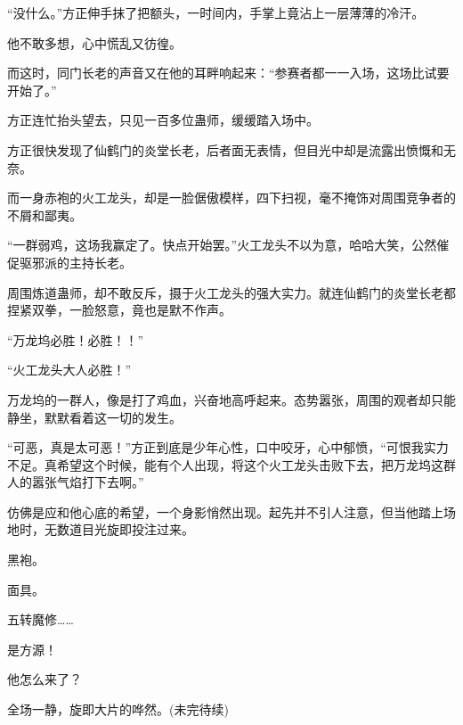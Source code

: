 \begin{this_body}
“没什么。”方正伸手抹了把额头，一时间内，手掌上竟沾上一层薄薄的冷汗。

他不敢多想，心中慌乱又彷徨。

而这时，同门长老的声音又在他的耳畔响起来：“参赛者都一一入场，这场比试要开始了。”

方正连忙抬头望去，只见一百多位蛊师，缓缓踏入场中。

方正很快发现了仙鹤门的炎堂长老，后者面无表情，但目光中却是流露出愤慨和无奈。

而一身赤袍的火工龙头，却是一脸倨傲模样，四下扫视，毫不掩饰对周围竞争者的不屑和鄙夷。

“一群弱鸡，这场我赢定了。快点开始罢。”火工龙头不以为意，哈哈大笑，公然催促驱邪派的主持长老。

周围炼道蛊师，却不敢反斥，摄于火工龙头的强大实力。就连仙鹤门的炎堂长老都捏紧双拳，一脸怒意，竟也是默不作声。

“万龙坞必胜！必胜！！”

“火工龙头大人必胜！”

万龙坞的一群人，像是打了鸡血，兴奋地高呼起来。态势嚣张，周围的观者却只能静坐，默默看着这一切的发生。

“可恶，真是太可恶！”方正到底是少年心性，口中咬牙，心中郁愤，“可恨我实力不足。真希望这个时候，能有个人出现，将这个火工龙头击败下去，把万龙坞这群人的嚣张气焰打下去啊。”

仿佛是应和他心底的希望，一个身影悄然出现。起先并不引人注意，但当他踏上场地时，无数道目光旋即投注过来。

黑袍。

面具。

五转魔修……

是方源！

他怎么来了？

全场一静，旋即大片的哗然。(未完待续)

\end{this_body}

